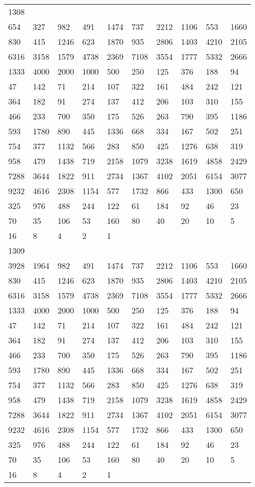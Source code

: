 \begin{longtable}{*{10}{l}}
1308&&&&&&&&&\\
654& 327& 982& 491& 1474& 737& 2212& 1106& 553& 1660\\
830& 415& 1246& 623& 1870& 935& 2806& 1403& 4210& 2105\\
6316& 3158& 1579& 4738& 2369& 7108& 3554& 1777& 5332& 2666\\
1333& 4000& 2000& 1000& 500& 250& 125& 376& 188& 94\\
47& 142& 71& 214& 107& 322& 161& 484& 242& 121\\
364& 182& 91& 274& 137& 412& 206& 103& 310& 155\\
466& 233& 700& 350& 175& 526& 263& 790& 395& 1186\\
593& 1780& 890& 445& 1336& 668& 334& 167& 502& 251\\
754& 377& 1132& 566& 283& 850& 425& 1276& 638& 319\\
958& 479& 1438& 719& 2158& 1079& 3238& 1619& 4858& 2429\\
7288& 3644& 1822& 911& 2734& 1367& 4102& 2051& 6154& 3077\\
9232& 4616& 2308& 1154& 577& 1732& 866& 433& 1300& 650\\
325& 976& 488& 244& 122& 61& 184& 92& 46& 23\\
70& 35& 106& 53& 160& 80& 40& 20& 10& 5\\
16& 8& 4& 2& 1& \\

1309&&&&&&&&&\\
3928& 1964& 982& 491& 1474& 737& 2212& 1106& 553& 1660\\
830& 415& 1246& 623& 1870& 935& 2806& 1403& 4210& 2105\\
6316& 3158& 1579& 4738& 2369& 7108& 3554& 1777& 5332& 2666\\
1333& 4000& 2000& 1000& 500& 250& 125& 376& 188& 94\\
47& 142& 71& 214& 107& 322& 161& 484& 242& 121\\
364& 182& 91& 274& 137& 412& 206& 103& 310& 155\\
466& 233& 700& 350& 175& 526& 263& 790& 395& 1186\\
593& 1780& 890& 445& 1336& 668& 334& 167& 502& 251\\
754& 377& 1132& 566& 283& 850& 425& 1276& 638& 319\\
958& 479& 1438& 719& 2158& 1079& 3238& 1619& 4858& 2429\\
7288& 3644& 1822& 911& 2734& 1367& 4102& 2051& 6154& 3077\\
9232& 4616& 2308& 1154& 577& 1732& 866& 433& 1300& 650\\
325& 976& 488& 244& 122& 61& 184& 92& 46& 23\\
70& 35& 106& 53& 160& 80& 40& 20& 10& 5\\
16& 8& 4& 2& 1& \\


\end{longtable}
